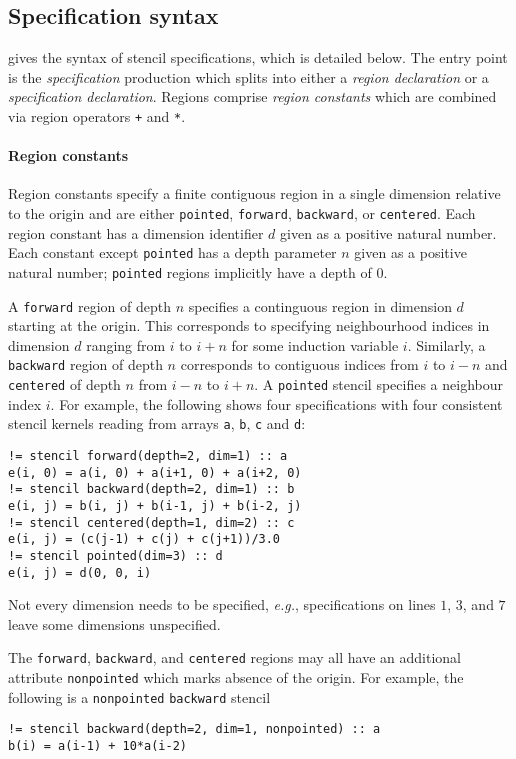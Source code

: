 \documentclass[10pt,preprint,numbers]{sigplanconf}
\theoremstyle{definition}
\newcommand{\eg}{\emph{e.g.}}
\newcommand{\nonterm}[1]{\textit{#1}}
\newcommand{\term}[1]{\texttt{#1}}
\begin{document}
\subsection{Specification syntax}
\label{subsec:syntax}

 gives the syntax of stencil specifications, which is
detailed below. The entry point is the \nonterm{specification} production which
splits into either a \emph{region declaration} or a \emph{specification
declaration}.
Regions comprise \emph{region constants} which are
combined via region operators \term{+} and \term{*}.

\paragraph{Region constants}

Region constants specify a finite contiguous region in a
single dimension relative to the origin and are either \term{pointed},
\term{forward}, \term{backward}, or \term{centered}.  Each region
constant has a dimension identifier $d$ given as a positive natural number.
Each constant except \term{pointed} has a depth
parameter $n$ given as a positive natural number; \term{pointed}
regions implicitly have a depth of $0$.

A \term{forward} region of depth $n$ specifies a continguous
region in dimension $d$ starting at the origin. This corresponds
to specifying neighbourhood indices in dimension $d$ ranging from $i$ to $i + n$
for some induction variable $i$. Similarly, a
\term{backward} region of depth $n$ corresponds to contiguous indices
from $i$ to $i - n$ and \term{centered}
of depth $n$ from $i - n$ to $i + n$. A \term{pointed}
stencil specifies a neighbour index $i$. For example, the
following shows four specifications with four consistent stencil
kernels reading from arrays \term{a}, \term{b}, \term{c} and \term{d}:
\begin{verbatim}
!= stencil forward(depth=2, dim=1) :: a
e(i, 0) = a(i, 0) + a(i+1, 0) + a(i+2, 0)
!= stencil backward(depth=2, dim=1) :: b
e(i, j) = b(i, j) + b(i-1, j) + b(i-2, j)
!= stencil centered(depth=1, dim=2) :: c
e(i, j) = (c(j-1) + c(j) + c(j+1))/3.0
!= stencil pointed(dim=3) :: d
e(i, j) = d(0, 0, i)
\end{verbatim}
Not every dimension needs to be specified, \eg{},
specifications on lines $1$, $3$, and $7$ leave some dimensions unspecified.

The \term{forward}, \term{backward}, and \term{centered} regions may
all have an additional attribute \term{nonpointed} which marks absence
of the origin.  For example, the following is a
\term{nonpointed} \term{backward} stencil
%
\begin{verbatim}
!= stencil backward(depth=2, dim=1, nonpointed) :: a
b(i) = a(i-1) + 10*a(i-2)
\end{verbatim}
\end{document}
